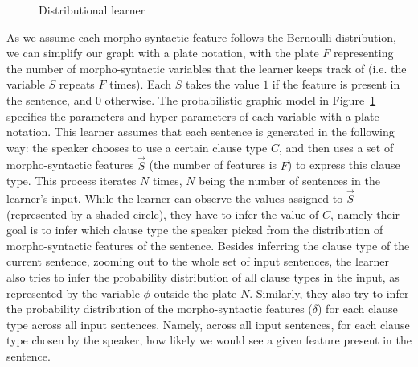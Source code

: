 \begin{figure}[H]
\begin{center}
\end{center}
\caption{Distributional learner}\label{fig:baseline-model}
\end{figure}

As we assume each morpho-syntactic feature follows the Bernoulli distribution, we can simplify our graph with a plate notation, with the plate $F$ representing the number of morpho-syntactic variables that the learner keeps track of (i.e. the variable $S$ repeats $F$ times). Each $S$ takes the value $1$ if the feature is present in the sentence, and $0$ otherwise. The probabilistic graphic model in Figure~\ref{fig:baseline-model} specifies the parameters and hyper-parameters of each variable with a plate notation. This learner assumes that each sentence is generated in the following way: the speaker chooses to use a certain clause type $C$, and then uses a set of morpho-syntactic features $\vec{S}$ (the number of features is $F$) to express this clause type. This process iterates $N$ times, $N$ being the number of sentences in the learner’s input. While the learner can observe the values assigned to $\vec{S}$ (represented by a shaded circle), they have to infer the value of $C$, namely their goal is to infer which clause type the speaker picked from the distribution of morpho-syntactic features of the sentence. Besides inferring the clause type of the current sentence, zooming out to the whole set of input sentences, the learner also tries to infer the probability distribution of all clause types in the input, as represented by the variable $\phi$ outside the plate $N$. Similarly, they also try to infer the probability distribution of the morpho-syntactic features ($\delta$) for each clause type across all input sentences. Namely, across all input sentences, for each clause type chosen by the speaker, how likely we would see a given feature present in the sentence. 


